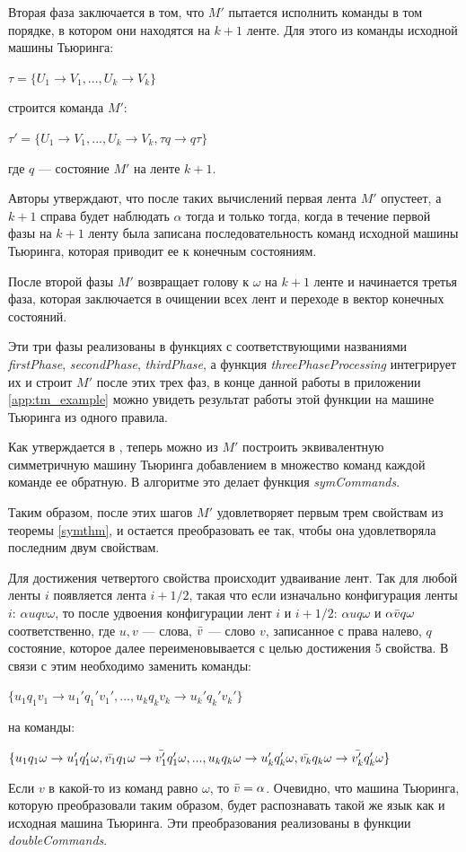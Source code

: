\documentclass[14pt]{matmex-diploma-custom}
\begin{document}
Вторая фаза заключается в том, что $M'$ пытается исполнить команды в том порядке, в котором они находятся на $k+1$ ленте. Для этого из команды исходной машины Тьюринга:
\begin{center}
    $\tau = \{ U_1 \to V_1, ... , U_k \to V_k \}$
\end{center}
строится команда $M'$:
\begin{center}
    $\tau' = \{ U_1 \to V_1, ... , U_k \to V_k, \tau q \to q \tau \}$
\end{center}
где $q$ --- состояние $M'$ на ленте $k+1$. 

Авторы утверждают, что после таких вычислений первая лента $M'$  опустеет, а $k+1$ справа будет наблюдать $\alpha$ тогда и только тогда, когда в течение первой фазы на $k+1$ ленту была записана последовательность команд исходной машины Тьюринга, которая приводит ее к конечным состояниям. 

После второй фазы $M'$ возвращает голову к $\omega$ на $k+1$ ленте и начинается третья фаза, которая заключается в очищении всех лент и переходе в вектор конечных состояний. 

Эти три фазы реализованы в функциях с соответствующими названиями \textit{firstPhase}, \textit{secondPhase}, \textit{thirdPhase}, а функция \textit{threePhaseProcessing} интегрирует их и строит $M'$ после этих трех фаз, в конце данной работы в приложении \ref{app:tm_example} можно увидеть результат работы этой функции на машине Тьюринга из одного правила. 

Как утверждается в \cite{symTM}, теперь можно из $M'$ построить эквивалентную симметричную машину Тьюринга добавлением в множество команд каждой команде ее обратную. В алгоритме это делает функция \textit{symCommands}. 

Таким образом, после этих шагов $M'$ удовлетворяет первым трем свойствам из теоремы \ref{symthm}, и остается преобразовать ее так, чтобы она удовлетворяла последним двум свойствам. 

Для достижения четвертого свойства происходит удваивание лент. Так для любой ленты $i$ появляется лента $i + 1/2$, такая что если изначально конфигурация ленты $i$: $\alpha u q v \omega$, то после удвоения конфигурации лент $i$ и $i+1/2$: $\alpha u q \omega$ и $\alpha \Bar{v} q \omega$ соответственно, где $u,v$ --- слова, $\Bar{v}$ --- слово $v$, записанное с права налево, $q$ состояние, которое далее переименовывается с целью достижения 5 свойства. В связи с этим необходимо заменить команды:
\begin{center}
    $\{ u_1 q_1 v_1 \to u_1' q_1' v_1',  ... , u_k q_k v_k \to u_k' q_k' v_k' \}$
\end{center}
на команды:
\begin{center}
    $\{ u_1 q_1 \omega \to u_1' q_1' \omega, \Bar{v_1} q_1 \omega \to \Bar{v'_1} q_1' \omega , ... , u_k q_k \omega \to u_k' q_k' \omega, \Bar{v_k} q_k \omega \to \Bar{v'_k} q_k' \omega \}$
\end{center}
Если $v$ в какой-то из команд равно $\omega$, то $\Bar{v} = \alpha$. Очевидно, что машина Тьюринга, которую преобразовали таким образом, будет распознавать такой же язык как и исходная машина Тьюринга. Эти преобразования реализованы в функции \textit{doubleCommands}. 
\end{document}
